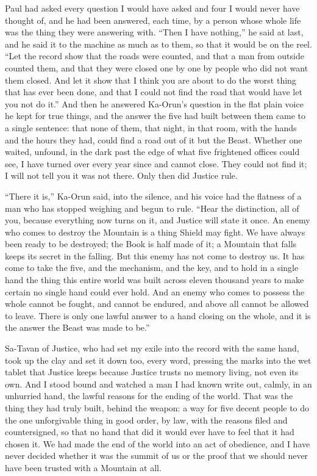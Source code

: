 Paul had asked every question I would have asked and four I would never have thought of, and he had been answered, each time, by a person whose whole life was the thing they were answering with. ``Then I have nothing,'' he said at last, and he said it to the machine as much as to them, so that it would be on the reel. ``Let the record show that the roads were counted, and that a man from outside counted them, and that they were closed one by one by people who did not want them closed. And let it show that I think you are about to do the worst thing that has ever been done, and that I could not find the road that would have let you not do it.'' And then he answered Ka-Orun's question in the flat plain voice he kept for true things, and the answer the five had built between them came to a single sentence: that none of them, that night, in that room, with the hands and the hours they had, could find a road out of it but the Beast. Whether one waited, unfound, in the dark past the edge of what five frightened offices could see, I have turned over every year since and cannot close. They could not find it; I will not tell you it was not there. Only then did Justice rule.\par

``There it is,'' Ka-Orun said, into the silence, and his voice had the flatness of a man who has stopped weighing and begun to rule. ``Hear the distinction, all of you, because everything now turns on it, and Justice will state it once. An enemy who comes to destroy the Mountain is a thing Shield may fight. We have always been ready to be destroyed; the Book is half made of it; a Mountain that falls keeps its secret in the falling. But this enemy has not come to destroy us. It has come to take the five, and the mechanism, and the key, and to hold in a single hand the thing this entire world was built across eleven thousand years to make certain no single hand could ever hold. And an enemy who comes to possess the whole cannot be fought, and cannot be endured, and above all cannot be allowed to leave. There is only one lawful answer to a hand closing on the whole, and it is the answer the Beast was made to be.''\par

Sa-Tavan of Justice, who had set my exile into the record with the same hand, took up the clay and set it down too, every word, pressing the marks into the wet tablet that Justice keeps because Justice trusts no memory living, not even its own. And I stood bound and watched a man I had known write out, calmly, in an unhurried hand, the lawful reasons for the ending of the world. That was the thing they had truly built, behind the weapon: a way for five decent people to do the one unforgivable thing in good order, by law, with the reasons filed and countersigned, so that no hand that did it would ever have to feel that it had chosen it. We had made the end of the world into an act of obedience, and I have never decided whether it was the summit of us or the proof that we should never have been trusted with a Mountain at all.\par

